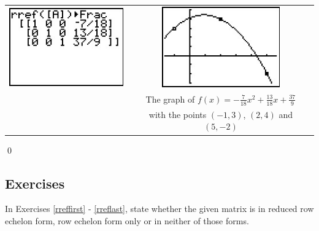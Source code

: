 \begin{ex}
\begin{center}
\begin{tabular}{cc}

\includegraphics[width=2in]{./MatricesGraphics/RREF01.jpg} \hspace{.5in} & \includegraphics[width=2in]{./MatricesGraphics/QUADFIT01.jpg} \\
& The graph of $f(x) = -\frac{7}{18} x^2 + \frac{13}{18} x + \frac{37}{9}$ \\ & with the points $(-1,3)$, $(2,4)$ and $(5,-2)$ \\

\end{tabular}

\end{center}

\qed

\end{ex}

\newpage

\subsection{Exercises}

In Exercises \ref{rreffirst} - \ref{rreflast}, state whether the given matrix is in reduced row echelon form, row echelon form only or in neither of those forms.

